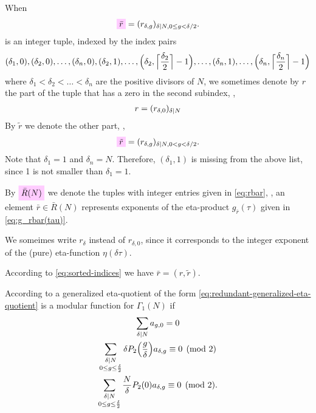 \documentclass{article}
\begin{document}
\begin{Definition}
  \label{def:rbar}
  When
  \begin{gather}
    \defineNotation[rbar]{\bar{r}}
    =
    (r_{\delta,g})_{\divides{\delta}{N}, 0\le g < \delta/2}.
    \label{eq:rbar}
  \end{gather}
  is an integer tuple, indexed by the index pairs
  \begin{gather}
    (\delta_1,0), (\delta_2,0), \ldots, (\delta_n,0),
    (\delta_2,1),\ldots, \Bigl(\delta_2,
    \Bigl\lceil\frac{\delta_2}{2} \Bigr\rceil-1\Bigr),
    \ldots,
    (\delta_n,1),
    \ldots,
    \Bigl(\delta_n,\Bigl\lceil\frac{\delta_n}{2}\Bigr\rceil-1\Bigr)
    \label{eq:sorted-indices}
  \end{gather}
  where $\delta_1<\delta_2< \ldots < \delta_n$ are the positive
  divisors of $N$, we sometimes denote by $r$ the part of the tuple
  that has a zero in the second subindex, \ie,
  \begin{gather}
    r = (r_{\delta,0})_{\delta \mid N}
  \end{gather}
  By $\tilde{r}$ we denote the other part, \ie,
  \begin{gather}
    \defineNotation[rtilde]{\tilde{r}}
    =
    (r_{\delta,g})_{\divides{\delta}{N}, 0 < g < \delta/2}.
    \label{eq:rtilde}
  \end{gather}
  Note that $\delta_1=1$ and $\delta_n=N$. Therefore, $(\delta_1,1)$
  is missing from the above list, since 1 is not smaller than
  $\delta_1=1$.

  By $\defineNotation[RbarN]{\bar{R}(N)}$ we denote the tuples with
  integer entries given in \eqref{eq:rbar}, \ie, an element
  $\bar{r} \in \bar{R}(N)$ represents exponents of the eta-product
  $g_{\bar{r}}(\tau)$ given in \eqref{eq:g_rbar(tau)}.

  We someimes write $r_\delta$ instead of $r_{\delta,0}$, since it
  corresponds to the integer exponent of the (pure) eta-function
  $\eta(\delta\tau)$.

  According to \eqref{eq:sorted-indices} we have
  $\bar{r} = (r, \tilde{r})$.
\end{Definition}

According to \cite[Thm.~3]{Robins:GeneralizedDedekindEtaProducts:1994}
a generalized eta-quotient of the form
\eqref{eq:redundant-generalized-eta-quotient} is a modular function
for $\Gamma_1(N)$ if
\begin{gather}
  \sum_{\delta \mid N} a_{g,0} = 0\\
  \sum_{\substack{\delta \mid N\\0 \le g \le \frac{\delta}{2}}}
  \delta P_2\Bigl(\frac{g}{\delta}\Bigr) a_{\delta,g} \equiv 0 \pmod{2}\\
  \sum_{\substack{\delta \mid N\\0 \le g \le \frac{\delta}{2}}}
  \frac{N}{\delta} P_2(0) a_{\delta,g} \equiv 0 \pmod{2}.
\end{gather}
\end{document}
